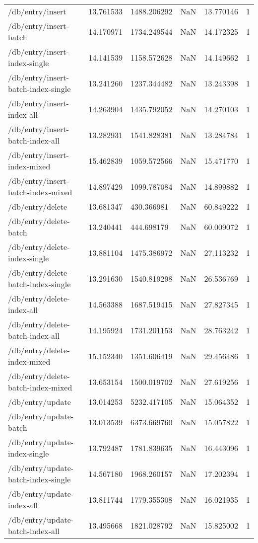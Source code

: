 \begin{tabularx}{\linewidth}{XXXXXX}
/db/entry/insert & 13.761533 & 1488.206292 & NaN & 13.770146 & 1 \\
/db/entry/insert-batch & 14.170971 & 1734.249544 & NaN & 14.172325 & 1 \\
/db/entry/insert-index-single & 14.141539 & 1158.572628 & NaN & 14.149662 & 1 \\
/db/entry/insert-batch-index-single & 13.241260 & 1237.344482 & NaN & 13.243398 & 1 \\
/db/entry/insert-index-all & 14.263904 & 1435.792052 & NaN & 14.270103 & 1 \\
/db/entry/insert-batch-index-all & 13.282931 & 1541.828381 & NaN & 13.284784 & 1 \\
/db/entry/insert-index-mixed & 15.462839 & 1059.572566 & NaN & 15.471770 & 1 \\
/db/entry/insert-batch-index-mixed & 14.897429 & 1099.787084 & NaN & 14.899882 & 1 \\
/db/entry/delete & 13.681347 & 430.366981 & NaN & 60.849222 & 1 \\
/db/entry/delete-batch & 13.240441 & 444.698179 & NaN & 60.009072 & 1 \\
/db/entry/delete-index-single & 13.881104 & 1475.386972 & NaN & 27.113232 & 1 \\
/db/entry/delete-batch-index-single & 13.291630 & 1540.819298 & NaN & 26.536769 & 1 \\
/db/entry/delete-index-all & 14.563388 & 1687.519415 & NaN & 27.827345 & 1 \\
/db/entry/delete-batch-index-all & 14.195924 & 1731.201153 & NaN & 28.763242 & 1 \\
/db/entry/delete-index-mixed & 15.152340 & 1351.606419 & NaN & 29.456486 & 1 \\
/db/entry/delete-batch-index-mixed & 13.653154 & 1500.019702 & NaN & 27.619256 & 1 \\
/db/entry/update & 13.014253 & 5232.417105 & NaN & 15.064352 & 1 \\
/db/entry/update-batch & 13.013539 & 6373.669760 & NaN & 15.057822 & 1 \\
/db/entry/update-index-single & 13.792487 & 1781.839635 & NaN & 16.443096 & 1 \\
/db/entry/update-batch-index-single & 14.567180 & 1968.260157 & NaN & 17.202394 & 1 \\
/db/entry/update-index-all & 13.811744 & 1779.355308 & NaN & 16.021935 & 1 \\
/db/entry/update-batch-index-all & 13.495668 & 1821.028792 & NaN & 15.825002 & 1 \\

\end{tabularx}
